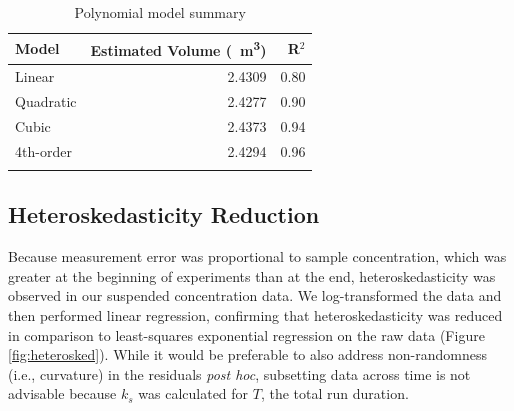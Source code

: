 \documentclass[geosciences,article,submit,moreauthors,pdftex]{Definitions/mdpi}
\begin{document}
\begin{table}[H]
\caption{Polynomial model summary}
\centering
\begin{tabular}{lrr}
\toprule
\textbf{Model}&\textbf{Estimated Volume (\SI{}{\metre\cubed})}&\textbf{R$^2$}\\
\midrule
Linear       &  2.4309     &   0.80\\
Quadratic    &  2.4277     &   0.90\\
Cubic        &  2.4373     &   0.94\\
4th-order    &  2.4294     &   0.96\\
\bottomrule
\label{tbl:flumevol}
\end{tabular}
\end{table}

\subsection{Heteroskedasticity Reduction}

Because measurement error was proportional to sample concentration, which was greater at the beginning of experiments than at the end, heteroskedasticity was observed in our suspended concentration data. We log-transformed the data and then performed linear regression, confirming that heteroskedasticity was reduced in comparison to least-squares exponential regression on the raw data (Figure \ref{fig:heterosked}). While it would be preferable to also address non-randomness (i.e., curvature) in the residuals \textit{post hoc}, subsetting data across time is not advisable because $k_s$ was calculated for $T$, the total run duration.
\end{document}

